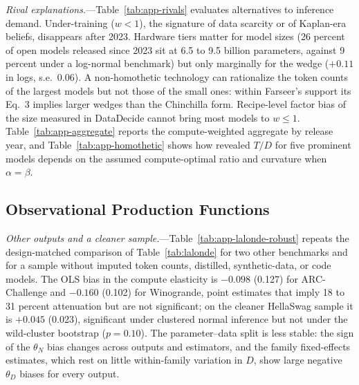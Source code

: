 \emph{Rival explanations.}---Table~\ref{tab:app-rivals} evaluates alternatives to inference demand. Under-training
($w<1$), the signature of data scarcity or of Kaplan-era beliefs, disappears after 2023. Hardware tiers matter for
model sizes (26 percent of open models released since 2023 sit at 6.5 to 9.5 billion parameters, against 9 percent
under a log-normal benchmark) but only marginally for the wedge ($+0.11$ in logs, s.e.\ 0.06). A non-homothetic
technology can rationalize the token counts of the largest models but not those of the small ones: within Farseer's
support its Eq.~3 implies larger wedges than the Chinchilla form. Recipe-level factor bias of the size measured in
DataDecide cannot bring most models to $w\le1$. Table~\ref{tab:app-aggregate} reports the compute-weighted aggregate
by release year, and Table~\ref{tab:app-homothetic} shows how revealed $T/D$ for five prominent models depends on the
assumed compute-optimal ratio and curvature when $\alpha=\beta$.






\clearpage

\subsection{Observational Production Functions}\label{app:add-obs}

\emph{Other outputs and a cleaner sample.}---Table~\ref{tab:app-lalonde-robust} repeats the design-matched
comparison of Table~\ref{tab:lalonde} for two other benchmarks and for a sample without imputed token counts,
distilled, synthetic-data, or code models. The OLS bias in the compute elasticity is $-0.098$ (0.127) for ARC-Challenge
and $-0.160$ (0.102) for Winogrande, point estimates that imply 18 to 31 percent attenuation but are not significant; on
the cleaner HellaSwag sample it is $+0.045$ (0.023), significant under clustered normal inference but not under the
wild-cluster bootstrap ($p=0.10$). The parameter--data split is less stable: the sign of the $\theta_N$ bias changes
across outputs and estimators, and the family fixed-effects estimates, which rest on little within-family variation in
$D$, show large negative $\theta_D$ biases for every output.

